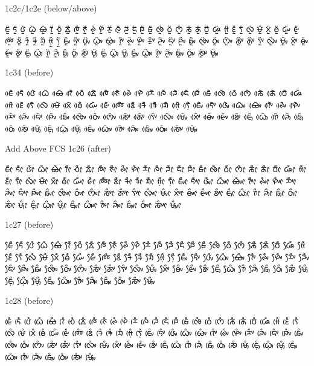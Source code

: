 \noindent
1c2c/1c2e (below/above)

\noindent
ᰀᰬᰮ ᰁᰬᰮ ᰂᰬᰮ ᰃᰬᰮ ᰄᰬᰮ ᰅᰬᰮ ᰆᰬᰮ ᰇᰬᰮ ᰈᰬᰮ ᰉᰬᰮ ᰊᰬᰮ ᰋᰬᰮ ᰌᰬᰮ ᰍᰬᰮ ᰎᰬᰮ ᰏᰬᰮ ᰐᰬᰮ ᰑᰬᰮ ᰒᰬᰮ ᰓᰬᰮ ᰔᰬᰮ ᰕᰬᰮ ᰖᰬᰮ ᰗᰬᰮ ᰘᰬᰮ ᰙᰬᰮ ᰚᰬᰮ ᰛᰬᰮ ᰜᰬᰮ ᰝᰬᰮ ᰞᰬᰮ ᰟᰬᰮ ᰠᰬᰮ ᰡᰬᰮ ᰢᰬᰮ ᰣᰬᰮ ᱍᰬᰮ ᱎᰬᰮ ᱏᰬᰮ ᰙ᰷ᰬᰮ ᰛ᰷ᰬᰮ ᰀᰤᰬᰮ ᰁᰤᰬᰮ ᰂᰤᰬᰮ ᰃᰤᰬᰮ ᰄᰤᰬᰮ ᰅᰤᰬᰮ ᰊᰤᰬᰮ ᰋᰤᰬᰮ ᰌᰤᰬᰮ ᰎᰤᰬᰮ ᰏᰤᰬᰮ ᰐᰤᰬᰮ ᰑᰤᰬᰮ ᰒᰤᰬᰮ ᰓᰤᰬᰮ ᰔᰤᰬᰮ ᰕᰤᰬᰮ ᰖᰤᰬᰮ ᰛᰤᰬᰮ ᰜᰤᰬᰮ ᰝᰤᰬᰮ ᰞᰤᰬᰮ ᰟᰤᰬᰮ ᰡᰤᰬᰮ ᰣᰤᰬᰮ ᰀᰥᰬᰮ ᰃᰥᰬᰮ ᰅᰥᰬᰮ ᰎᰥᰬᰮ ᰑᰥᰬᰮ ᰓᰥᰬᰮ ᰕᰥᰬᰮ ᰝᰥᰬᰮ ᰀ᰷ᰥᰬᰮ ᰃ᰷ᰥᰬᰮ ᰝ᰷ᰥᰬᰮ ᰀᰥᰤᰬᰮ ᰃᰥᰤᰬᰮ ᰅᰥᰤᰬᰮ ᰎᰥᰤᰬᰮ ᰑᰥᰤᰬᰮ ᰓᰥᰤᰬᰮ ᰕᰥᰤᰬᰮ ᰝᰥᰤᰬᰮ 

\noindent
1c34 (before)

\noindent
ᰀᰴᰶ ᰁᰴᰶ ᰂᰴᰶ ᰃᰴᰶ ᰄᰴᰶ ᰅᰴᰶ ᰆᰴᰶ ᰇᰴᰶ ᰈᰴᰶ ᰉᰴᰶ ᰊᰴᰶ ᰋᰴᰶ ᰌᰴᰶ ᰍᰴᰶ ᰎᰴᰶ ᰏᰴᰶ ᰐᰴᰶ ᰑᰴᰶ ᰒᰴᰶ ᰓᰴᰶ ᰔᰴᰶ ᰕᰴᰶ ᰖᰴᰶ ᰗᰴᰶ ᰘᰴᰶ ᰙᰴᰶ ᰚᰴᰶ ᰛᰴᰶ ᰜᰴᰶ ᰝᰴᰶ ᰞᰴᰶ ᰟᰴᰶ ᰠᰴᰶ ᰡᰴᰶ ᰢᰴᰶ ᰣᰴᰶ ᱍᰴᰶ ᱎᰴᰶ ᱏᰴᰶ ᰙ᰷ᰴᰶ ᰛ᰷ᰴᰶ ᰀᰤᰴᰶ ᰁᰤᰴᰶ ᰂᰤᰴᰶ ᰃᰤᰴᰶ ᰄᰤᰴᰶ ᰅᰤᰴᰶ ᰊᰤᰴᰶ ᰋᰤᰴᰶ ᰌᰤᰴᰶ ᰎᰤᰴᰶ ᰏᰤᰴᰶ ᰐᰤᰴᰶ ᰑᰤᰴᰶ ᰒᰤᰴᰶ ᰓᰤᰴᰶ ᰔᰤᰴᰶ ᰕᰤᰴᰶ ᰖᰤᰴᰶ ᰛᰤᰴᰶ ᰜᰤᰴᰶ ᰝᰤᰴᰶ ᰞᰤᰴᰶ ᰟᰤᰴᰶ ᰡᰤᰴᰶ ᰣᰤᰴᰶ ᰀᰥᰴᰶ ᰃᰥᰴᰶ ᰅᰥᰴᰶ ᰎᰥᰴᰶ ᰑᰥᰴᰶ ᰓᰥᰴᰶ ᰕᰥᰴᰶ ᰝᰥᰴᰶ ᰀ᰷ᰥᰴᰶ ᰃ᰷ᰥᰴᰶ ᰝ᰷ᰥᰴᰶ ᰀᰥᰤᰴᰶ ᰃᰥᰤᰴᰶ ᰅᰥᰤᰴᰶ ᰎᰥᰤᰴᰶ ᰑᰥᰤᰴᰶ ᰓᰥᰤᰴᰶ ᰕᰥᰤᰴᰶ ᰝᰥᰤᰴᰶ 

\noindent
Add Above FCS
\noindent
1c26 (after)

\noindent
ᰀᰦᰰ ᰁᰦᰰ ᰂᰦᰰ ᰃᰦᰰ ᰄᰦᰰ ᰅᰦᰰ ᰆᰦᰰ ᰇᰦᰰ ᰈᰦᰰ ᰉᰦᰰ ᰊᰦᰰ ᰋᰦᰰ ᰌᰦᰰ ᰍᰦᰰ ᰎᰦᰰ ᰏᰦᰰ ᰐᰦᰰ ᰑᰦᰰ ᰒᰦᰰ ᰓᰦᰰ ᰔᰦᰰ ᰕᰦᰰ ᰖᰦᰰ ᰗᰦᰰ ᰘᰦᰰ ᰙᰦᰰ ᰚᰦᰰ ᰛᰦᰰ ᰜᰦᰰ ᰝᰦᰰ ᰞᰦᰰ ᰟᰦᰰ ᰠᰦᰰ ᰡᰦᰰ ᰢᰦᰰ ᰣᰦᰰ ᱍᰦᰰ ᱎᰦᰰ ᱏᰦᰰ ᰙ᰷ᰦᰰ ᰛ᰷ᰦᰰ ᰀᰤᰦᰰ ᰁᰤᰦᰰ ᰂᰤᰦᰰ ᰃᰤᰦᰰ ᰄᰤᰦᰰ ᰅᰤᰦᰰ ᰊᰤᰦᰰ ᰋᰤᰦᰰ ᰌᰤᰦᰰ ᰎᰤᰦᰰ ᰏᰤᰦᰰ ᰐᰤᰦᰰ ᰑᰤᰦᰰ ᰒᰤᰦᰰ ᰓᰤᰦᰰ ᰔᰤᰦᰰ ᰕᰤᰦᰰ ᰖᰤᰦᰰ ᰛᰤᰦᰰ ᰜᰤᰦᰰ ᰝᰤᰦᰰ ᰞᰤᰦᰰ ᰟᰤᰦᰰ ᰡᰤᰦᰰ ᰣᰤᰦᰰ ᰀᰥᰦᰰ ᰃᰥᰦᰰ ᰅᰥᰦᰰ ᰎᰥᰦᰰ ᰑᰥᰦᰰ ᰓᰥᰦᰰ ᰕᰥᰦᰰ ᰝᰥᰦᰰ ᰀ᰷ᰥᰦᰰ ᰃ᰷ᰥᰦᰰ ᰝ᰷ᰥᰦᰰ ᰀᰥᰤᰦᰰ ᰃᰥᰤᰦᰰ ᰅᰥᰤᰦᰰ ᰎᰥᰤᰦᰰ ᰑᰥᰤᰦᰰ ᰓᰥᰤᰦᰰ ᰕᰥᰤᰦᰰ ᰝᰥᰤᰦᰰ 

\noindent
1c27 (before)

\noindent
ᰀᰧᰰ ᰁᰧᰰ ᰂᰧᰰ ᰃᰧᰰ ᰄᰧᰰ ᰅᰧᰰ ᰆᰧᰰ ᰇᰧᰰ ᰈᰧᰰ ᰉᰧᰰ ᰊᰧᰰ ᰋᰧᰰ ᰌᰧᰰ ᰍᰧᰰ ᰎᰧᰰ ᰏᰧᰰ ᰐᰧᰰ ᰑᰧᰰ ᰒᰧᰰ ᰓᰧᰰ ᰔᰧᰰ ᰕᰧᰰ ᰖᰧᰰ ᰗᰧᰰ ᰘᰧᰰ ᰙᰧᰰ ᰚᰧᰰ ᰛᰧᰰ ᰜᰧᰰ ᰝᰧᰰ ᰞᰧᰰ ᰟᰧᰰ ᰠᰧᰰ ᰡᰧᰰ ᰢᰧᰰ ᰣᰧᰰ ᱍᰧᰰ ᱎᰧᰰ ᱏᰧᰰ ᰙ᰷ᰧᰰ ᰛ᰷ᰧᰰ ᰀᰤᰧᰰ ᰁᰤᰧᰰ ᰂᰤᰧᰰ ᰃᰤᰧᰰ ᰄᰤᰧᰰ ᰅᰤᰧᰰ ᰊᰤᰧᰰ ᰋᰤᰧᰰ ᰌᰤᰧᰰ ᰎᰤᰧᰰ ᰏᰤᰧᰰ ᰐᰤᰧᰰ ᰑᰤᰧᰰ ᰒᰤᰧᰰ ᰓᰤᰧᰰ ᰔᰤᰧᰰ ᰕᰤᰧᰰ ᰖᰤᰧᰰ ᰛᰤᰧᰰ ᰜᰤᰧᰰ ᰝᰤᰧᰰ ᰞᰤᰧᰰ ᰟᰤᰧᰰ ᰡᰤᰧᰰ ᰣᰤᰧᰰ ᰀᰥᰧᰰ ᰃᰥᰧᰰ ᰅᰥᰧᰰ ᰎᰥᰧᰰ ᰑᰥᰧᰰ ᰓᰥᰧᰰ ᰕᰥᰧᰰ ᰝᰥᰧᰰ ᰀ᰷ᰥᰧᰰ ᰃ᰷ᰥᰧᰰ ᰝ᰷ᰥᰧᰰ ᰀᰥᰤᰧᰰ ᰃᰥᰤᰧᰰ ᰅᰥᰤᰧᰰ ᰎᰥᰤᰧᰰ ᰑᰥᰤᰧᰰ ᰓᰥᰤᰧᰰ ᰕᰥᰤᰧᰰ ᰝᰥᰤᰧᰰ 

\noindent
1c28 (before)

\noindent
ᰀᰨᰱ ᰁᰨᰱ ᰂᰨᰱ ᰃᰨᰱ ᰄᰨᰱ ᰅᰨᰱ ᰆᰨᰱ ᰇᰨᰱ ᰈᰨᰱ ᰉᰨᰱ ᰊᰨᰱ ᰋᰨᰱ ᰌᰨᰱ ᰍᰨᰱ ᰎᰨᰱ ᰏᰨᰱ ᰐᰨᰱ ᰑᰨᰱ ᰒᰨᰱ ᰓᰨᰱ ᰔᰨᰱ ᰕᰨᰱ ᰖᰨᰱ ᰗᰨᰱ ᰘᰨᰱ ᰙᰨᰱ ᰚᰨᰱ ᰛᰨᰱ ᰜᰨᰱ ᰝᰨᰱ ᰞᰨᰱ ᰟᰨᰱ ᰠᰨᰱ ᰡᰨᰱ ᰢᰨᰱ ᰣᰨᰱ ᱍᰨᰱ ᱎᰨᰱ ᱏᰨᰱ ᰙ᰷ᰨᰱ ᰛ᰷ᰨᰱ ᰀᰤᰨᰱ ᰁᰤᰨᰱ ᰂᰤᰨᰱ ᰃᰤᰨᰱ ᰄᰤᰨᰱ ᰅᰤᰨᰱ ᰊᰤᰨᰱ ᰋᰤᰨᰱ ᰌᰤᰨᰱ ᰎᰤᰨᰱ ᰏᰤᰨᰱ ᰐᰤᰨᰱ ᰑᰤᰨᰱ ᰒᰤᰨᰱ ᰓᰤᰨᰱ ᰔᰤᰨᰱ ᰕᰤᰨᰱ ᰖᰤᰨᰱ ᰛᰤᰨᰱ ᰜᰤᰨᰱ ᰝᰤᰨᰱ ᰞᰤᰨᰱ ᰟᰤᰨᰱ ᰡᰤᰨᰱ ᰣᰤᰨᰱ ᰀᰥᰨᰱ ᰃᰥᰨᰱ ᰅᰥᰨᰱ ᰎᰥᰨᰱ ᰑᰥᰨᰱ ᰓᰥᰨᰱ ᰕᰥᰨᰱ ᰝᰥᰨᰱ ᰀ᰷ᰥᰨᰱ ᰃ᰷ᰥᰨᰱ ᰝ᰷ᰥᰨᰱ ᰀᰥᰤᰨᰱ ᰃᰥᰤᰨᰱ ᰅᰥᰤᰨᰱ ᰎᰥᰤᰨᰱ ᰑᰥᰤᰨᰱ ᰓᰥᰤᰨᰱ ᰕᰥᰤᰨᰱ ᰝᰥᰤᰨᰱ 

